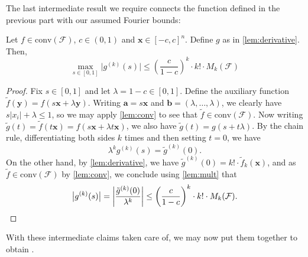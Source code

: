 The last intermediate result we require connects the function defined in the previous part with our assumed Fourier bounds:
    \begin{lemma}
    \label{lemma:finallem}
        Let $f \in \mathrm{conv}(\mathcal{F}) $, $c \in (0,1) $ and $\mathbf{x} \in [ -c , c]^n $. 
        Define $g$ as in \cref{lem:derivative}. 
        Then, 
        \begin{equation*}
            \max _{s \in[0,1]} \bigl| g^{(k)}(s) \bigr|
            \leq\left(\frac{c}{1-c}\right)^{k} \cdot k! \cdot M_{k}(\mathcal{F})
        \end{equation*}
    \end{lemma}
    \begin{proof}
        Fix $s \in [ 0,1]$ and let $\lambda=1-c \in [0,1]$.  Define the auxiliary function $\tilde{f}(\mathbf{y})=f(s\mathbf{x}+\lambda\mathbf{y})$. Writing $\mathbf{a}=s\mathbf{x}$ and $\mathbf{b}=(\lambda,\ldots,\lambda)$, we clearly have $s |x_i| + \lambda \leq 1$, so we may apply \cref{lem:conv} to see that $\tilde{f}\in \mathrm{conv}(\mathcal{F})$.
        Now writing $\tilde{g}(t) = \tilde{f}(t\mathbf{x})=f(s\mathbf{x}+\lambda t\mathbf{x})$, we also have $\tilde{g}(t)=g(s+t\lambda)$. By the chain rule, differentiating both sides $k$ times and then setting $t=0$, we have
        \begin{equation*}
            \lambda^k g^{(k)}(s)=\tilde{g}^{(k)}(0).
        \end{equation*}
        On the other hand, by \cref{lem:derivative}, we have $\tilde{g}^{(k)}(0)=k!\cdot \tilde{f}_k(\mathbf{x})$, and as $\tilde{f}\in \mathrm{conv}(\mathcal{F})$ by \cref{lem:conv}, we conclude using \cref{lem:mult} that
        \[
            \bigl|g^{(k)}(s)\bigr|=\left|\frac{\tilde{g}^{(k)}(0)}{\lambda^k}\right|\leq \left(\frac{c}{1-c}\right)^k \cdot k!\cdot M_k(\mathcal{F}) . \qedhere
        \]
    \end{proof}
    With these intermediate claims taken care of, we may now put them together to obtain .
